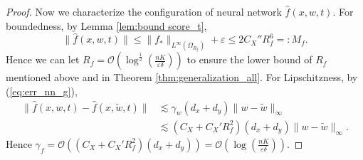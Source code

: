 \documentclass[11pt]{article}
\numberwithin{equation}{section}
\renewcommand{\eqref}[1]{(\ref{#1})}
\begin{document}
\begin{proof}
    Now we characterize the configuration of neural network $\widehat{f}(x,w,t)$.
    For boundedness, by Lemma \ref{lem:bound score_t},
    \begin{equation}
        \|\widehat{f}(x,w,t)\|\leq \|f_*\|_{L^\infty(\Omega_{R_f})}+\varepsilon\leq 2C_X''R_f^6=:M_f.
    \end{equation}
    Hence we can let $R_f=\mathcal{O}\left(\log^{\frac{1}{2}}\left(\frac{nK}{\varepsilon\delta}\right)\right)$ to ensure the lower bound of $R_f$ mentioned above and in Theorem \ref{thm:generalization_all}.
    For Lipschitzness, by \eqref{eq:err_nn_g},
    \begin{equation}
        \begin{aligned}
            \|\widehat{f}(x,w,t)-\widehat{f}(x,\widetilde{w},t)\|
            &\lesssim \gamma_w(d_x+d_y)\|w-\widetilde{w}\|_{\infty} \\
            &\lesssim (C_X+C_X'R_f^2)(d_x+d_y)\|w-\widetilde{w}\|_{\infty}.
        \end{aligned}
    \end{equation}
    Hence $\gamma_f=\mathcal{O}\left((C_X+C_X'R_f^2)(d_x+d_y)\right)=\mathcal{O}\left(\log\left(\frac{nK}{\varepsilon\delta}\right)\right)$.
    

\end{proof}
\end{document}
